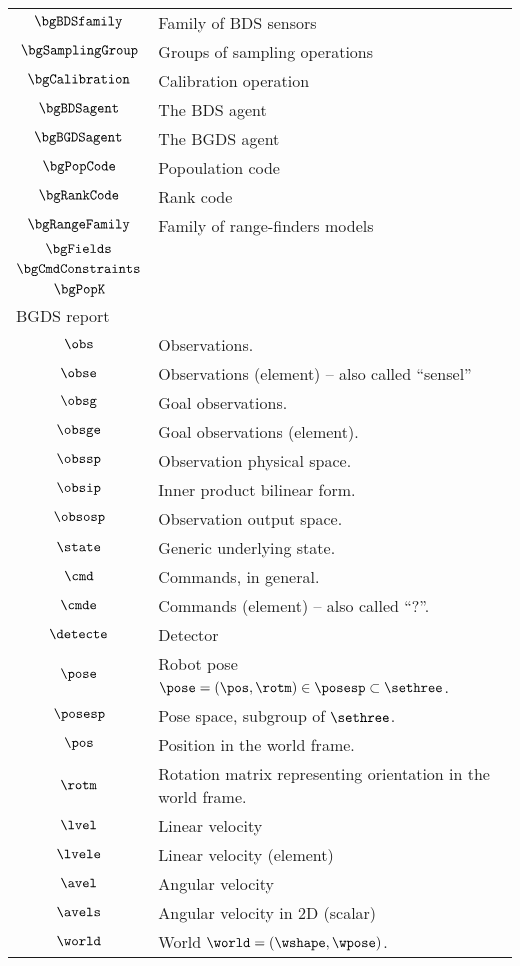 \begin{longtable}{cl}
 $\bgBDSfamily$ &  Family of BDS sensors\\ 
 $\bgSamplingGroup$ &  Groups of sampling operations\\ 
 $\bgCalibration$ &  Calibration operation\\ 
 $\bgBDSagent$ &  The BDS agent\\ 
 $\bgBGDSagent$ &  The BGDS agent\\ 
 $\bgPopCode$ &  Popoulation code\\ 
 $\bgRankCode$ &  Rank code\\ 
 $\bgRangeFamily$ &  Family of range-finders models\\ 
 $\bgFields$ & \\ 
 $\bgCmdConstraints$ & \\ 
 $\bgPopK$ & \\ 
 \multicolumn{2}{l}{BGDS report}\\ 
 \hline
$\obs$ &  Observations.\\ 
 $\obse$ &  Observations (element) -- also called ``sensel''\\ 
 $\obsg$ &  Goal observations.\\ 
 $\obsge$ &  Goal observations (element).\\ 
 $\obssp$ &  Observation physical space.\\ 
 $\obsip$ &  Inner product bilinear form.\\ 
 $\obsosp$ &  Observation output space.\\ 
 $\state$ &  Generic underlying state.\\ 
 $\cmd$ &  Commands, in general.\\ 
 $\cmde$ &  Commands (element) -- also called ``?''.\\ 
 $\detecte$ &  Detector\\ 
 $\pose$ &  Robot pose $\pose = (\pos, \rotm) \in \posesp \subset \sethree$.\\ 
 $\posesp$ &  Pose space, subgroup of $\sethree$.\\ 
 $\pos$ &  Position in the world frame.\\ 
 $\rotm$ &  Rotation matrix representing orientation in the world frame.\\ 
 $\lvel$ &  Linear velocity\\ 
 $\lvele$ &  Linear velocity (element)\\ 
 $\avel$ &  Angular velocity\\ 
 $\avels$ &  Angular velocity in 2D (scalar)\\ 
 $\world$ &  World $\world = (\wshape,\wpose)$.\\ 

\end{longtable}
